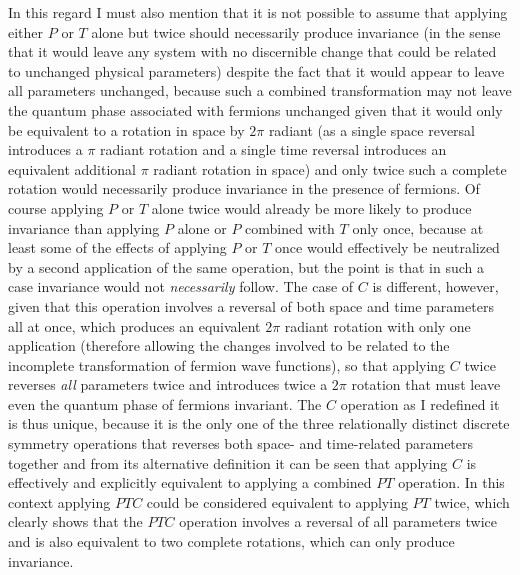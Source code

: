\documentclass[notitlepage,12pt]{report}
\begin{document}
In this regard I must also mention that it is not possible to assume that applying either $P$ or $T$ alone but twice should necessarily produce invariance (in the sense that it would leave any system with no discernible change that could be related to unchanged physical parameters) despite the fact that it would appear to leave all parameters unchanged, because such a combined transformation may not leave the quantum phase associated with fermions unchanged given that it would only be equivalent to a rotation in space by $2\pi$ radiant (as a single space reversal introduces a $\pi$ radiant rotation and a single time reversal introduces an equivalent additional $\pi$ radiant rotation in space) and only twice such a complete rotation would necessarily produce invariance in the presence of fermions. Of course applying $P$ or $T$ alone twice would already be more likely to produce invariance than applying $P$ alone or $P$ combined with $T$ only once, because at least some of the effects of applying $P$ or $T$ once would effectively be neutralized by a second application of the same operation, but the point is that in such a case invariance would not \textit{necessarily} follow. The case of $C$ is different, however, given that this operation involves a reversal of both space and time parameters all at once, which produces an equivalent $2\pi$ radiant rotation with only one application (therefore allowing the changes involved to be related to the incomplete transformation of fermion wave functions), so that applying $C$ twice reverses \textit{all} parameters twice and introduces twice a $2\pi$ rotation that must leave even the quantum phase of fermions invariant. The $C$ operation as I redefined it is thus unique, because it is the only one of the three relationally distinct discrete symmetry operations that reverses both space- and time-related parameters together and from its alternative definition it can be seen that applying $C$ is effectively and explicitly equivalent to applying a combined $PT$ operation. In this context applying $PTC$ could be considered equivalent to applying $PT$ twice, which clearly shows that the $PTC$ operation involves a reversal of all parameters twice and is also equivalent to two complete rotations, which can only produce invariance.
\end{document}
